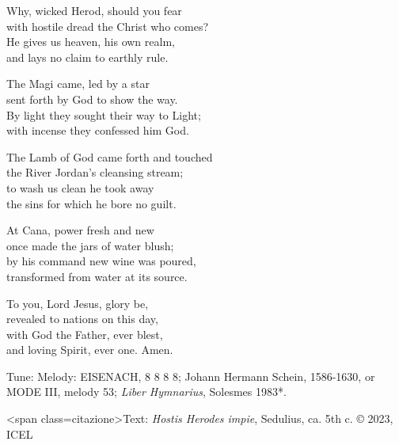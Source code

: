 \hymn

\settowidth{\versewidth}{with hostile dread the Christ who comes?}

\begin{hymnverse}%
Why, wicked Herod, should you fear\\
with hostile dread the Christ who comes?\\
He gives us heaven, his own realm,\\
and lays no claim to earthly rule.

The Magi came, led by a star\\
sent forth by God to show the way.\\
By light they sought their way to Light;\\
with incense they confessed him God.

The Lamb of God came forth and touched\\
the River Jordan’s cleansing stream;\\
to wash us clean he took away\\
the sins for which he bore no guilt.

At Cana, power fresh and new\\
once made the jars of water blush;\\
by his command new wine was poured,\\
transformed from water at its source.

To you, Lord Jesus, glory be,\\
revealed to nations on this day,\\
with God the Father, ever blest,\\
and loving Spirit, ever one. Amen.
\end{hymnverse}

\begin{hymnsource}
Tune: Melody: EISENACH, 8 8 8 8; Johann Hermann Schein, 1586-1630, or MODE III, melody 53; \emph{Liber Hymnarius}, Solesmes 1983*.

<span class=citazione>Text: \emph{Hostis Herodes impie}, Sedulius, ca. 5th c. © 2023, ICEL
\end{hymnsource}